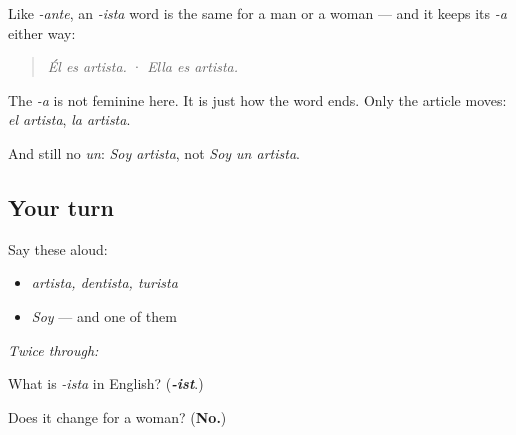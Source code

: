 \begin{grammarlens}[title={Grammar Lens: -ista never changes}]
Like \emph{-ante}, an \emph{-ista} word is the same for a man or a woman — and it keeps its \emph{-a} either way:

\begin{quote}
\emph{Él es artista.}  ·  \emph{Ella es artista.}
\end{quote}

The \emph{-a} is not feminine here. It is just how the word ends. Only the article moves: \emph{el artista}, \emph{la artista}.

And still no \emph{un}: \emph{Soy artista}, not \emph{Soy un artista}.
\end{grammarlens}

\subsection*{Your turn}
Say these aloud:

\begin{itemize}
\raggedright
  \item \emph{artista, dentista, turista}
  \item \emph{Soy} — and one of them
\end{itemize}

\emph{Twice through:}

\begin{tcolorbox}[breakable,colback=teal!4,colframe=teal!35!black,title={Before you move on}]
What is \emph{-ista} in English? (\emph{\textbf{-ist}}.)

Does it change for a woman? (\textbf{No.})
\end{tcolorbox}
